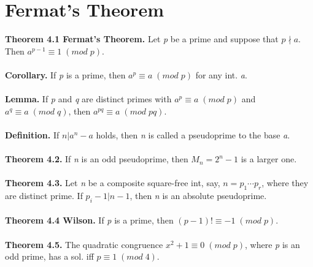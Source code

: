 \documentclass[a4paper,10pt]{article}
\begin{document}
\section{Fermat's Theorem}
\textbf{Theorem 4.1 Fermat's Theorem.} Let \textit{p} be a prime and suppose that \textit{$p\nmid a$}. Then \textit{$a^{p-1}\equiv 1 \; (mod \; p)$}. \\ \\
\textbf{Corollary.} If \textit{p} is a prime, then \textit{$a^{p}\equiv a \; (mod \; p)$} for any int. \textit{a}. \\ \\
\textbf{Lemma.} If \textit{p} and \textit{q} are distinct primes with \textit{$a^{p}\equiv a \; (mod \; p)$} and \textit{$a^{q}\equiv a \; (mod \; q)$}, then \textit{$a^{pq}\equiv a \; (mod \; pq)$}. \\ \\
\textbf{Definition.} If \textit{$n|a^{n}-a$} holds, then \textit{n} is called a pseudoprime to the base \textit{a}. \\ \\
\textbf{Theorem 4.2.} If \textit{n} is an odd pseudoprime, then \textit{$M_{n}=2^{n}-1$} is a larger one. \\ \\
\textbf{Theorem 4.3.} Let \textit{n} be a composite square-free int, say, \textit{$n=p_{1}\cdots p_{r}$}, where they are distinct prime. If \textit{$p_{i}-1|n-1$}, then \textit{n} is an absolute pseudoprime. \\ \\
\textbf{Theorem 4.4 Wilson.} If \textit{p} is a prime, then \textit{$(p-1)!\equiv -1 \; (mod \; p)$}. \\ \\
\textbf{Theorem 4.5.} The quadratic congruence \textit{$x^{2}+1\equiv 0 \; (mod \; p)$}, where \textit{p} is an odd prime, has a sol. iff \textit{$p\equiv 1 \; (mod \; 4)$}. \\ \\
\end{document}
